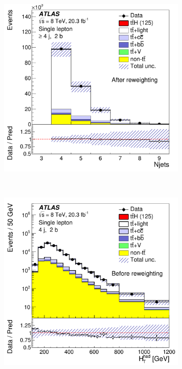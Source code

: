 \begin{figure}[!tp]
\begin{center}
  \begin{subfigure}{0.49\textwidth}{\includegraphics[width=\textwidth]{Modeling/Figures/fig_05b.pdf}}\label{fig:ttbarseqrw_b}
    \caption{}\end{subfigure} \\
  \begin{subfigure}{0.49\textwidth}{\includegraphics[width=\textwidth]{Modeling/Figures/fig_05c.pdf}}\label{fig:ttbarseqrw_c}

\end{subfigure}
\end{center}
\end{figure}
